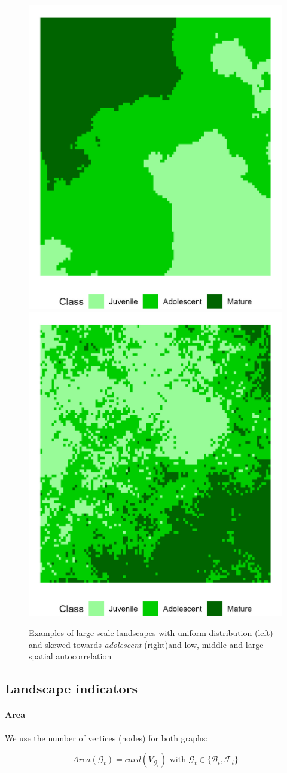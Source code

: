 \begin{figure}[H]
    \includegraphics[width=0.4\linewidth]{figures/wildland/large_land_autocorr_1.8_distrib_1}
    \includegraphics[width=0.4\linewidth]{figures/wildland/large_land_autocorr_0.5_distrib_4}
    \caption{Examples of large scale landscapes with uniform distribution (left) and skewed towards \textit{adolescent} (right)and low, middle and large spatial autocorrelation}
    \label{fig:ex_nlm}
\end{figure}
\clearpage





\subsection{Landscape indicators}
\label{sec:appendix_wildland__indicators}

\paragraph{Area}
We use the number of vertices (nodes) for both graphs:

\begin{equation}
Area(\mathcal{G}_t) = card(V_{\mathcal{G}_t}) \text{ with } \mathcal{G}_t\in\{\mathcal{B}_t,\mathcal{F}_t\}
\label{eq:area}
\end{equation}

